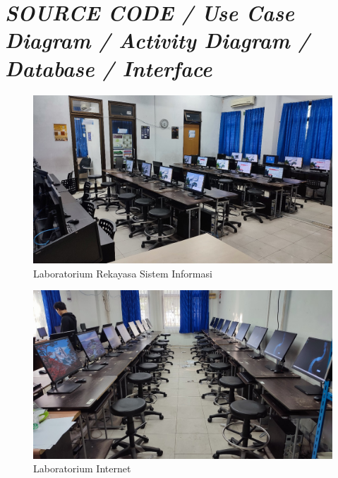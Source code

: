 %
%
%
%


\renewcommand{\thepage}{D - \arabic{page}}
\chapter{\textit{SOURCE CODE / Use Case Diagram / Activity Diagram / Database / Interface}}


\begin{figure}[h]
	\centering
	\includegraphics[width=0.82\linewidth]{konten/gambar/lab-rsi.jpg}
	\caption{Laboratorium Rekayasa Sistem Informasi \protect\cite{labsi2023}}
	\label{fig:lab-rsi-bab2}
\end{figure}

\begin{figure}[h]
	\centering
	\includegraphics[width=0.82\linewidth]{konten/gambar/lab-internet.jpg}
	\caption{Laboratorium Internet \protect\cite{labsi2023}}
	\label{fig:lab-int-bab2}
\end{figure}

